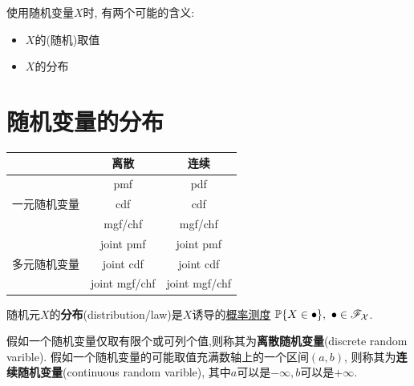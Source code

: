 \begin{remark}
    使用随机变量$X$时, 有两个可能的含义:
    \begin{itemize}
        \item $X$的(随机)取值
        \item $X$的分布
    \end{itemize}
\end{remark}

\section{随机变量的分布}

\begin{table}[]
    \centering
    \begin{tabular}{|c|c|c|}
        \hline
                                      & 离散          & 连续          \\ \hline
        \multirow{3}{*}{一元随机变量} & pmf           & pdf           \\ \cline{2-3}
                                      & cdf           & cdf           \\ \cline{2-3}
                                      & mgf/chf       & mgf/chf       \\ \hline
        \multirow{3}{*}{多元随机变量} & joint pmf     & joint pmf     \\ \cline{2-3}
                                      & joint cdf     & joint cdf     \\ \cline{2-3}
                                      & joint mgf/chf & joint mgf/chf \\ \hline
    \end{tabular}
\end{table}

\begin{definition}
    随机元$X$的\textbf{分布}(distribution/law)是$X$诱导的\underline{概率测度}
    $\P\{X\in\bullet\},\ \bullet\in\mathscr{F}_{\mathcal{X}}$.
\end{definition}

\begin{definition}[离散与连续随机变量]
    假如一个随机变量仅取有限个或可列个值,则称其为\textbf{离散随机变量}(discrete random varible). 假如一个随机变量的可能取值充满数轴上的一个区间$ (a,b) $, 则称其为\textbf{连续随机变量}(continuous random varible), 其中$ a $可以是$ -\infty ,b $可以是$ +\infty $.
\end{definition}

